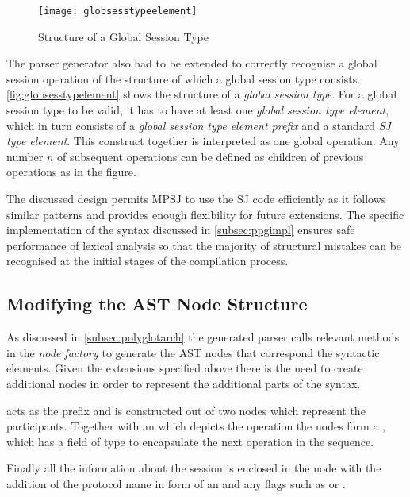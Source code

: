 \begin{figure}[H]
\begin{center}
\texttt{[image: globsesstypeelement]}
\caption{Structure of a Global Session Type}
\label{fig:globsesstypelement}
\end{center}
\end{figure}

The parser generator also had to be extended to correctly recognise a global session operation of the structure  of which a global session type consists. \autoref{fig:globsesstypelement} shows the structure of a \textit{global session type}. For a global session type to be valid, it has to have at least one \textit{global session type element}, which in turn consists of a \textit{global session type element prefix} and a standard \textit{SJ type element}. This construct together is interpreted as one global operation. Any number $n$ of subsequent operations can be defined as children of previous operations as in the figure. 

The discussed design permits MPSJ to use the SJ code efficiently as it follows similar patterns and provides enough flexibility for future extensions. The specific implementation of the syntax discussed in \autoref{subsec:ppgimpl} ensures safe performance of lexical analysis so that the majority of structural mistakes can be recognised at the initial stages of the compilation process.


\subsection{Modifying the AST Node Structure}

As discussed in \autoref{subsec:polyglotarch} the generated parser calls relevant methods in the \textit{node factory} to generate the AST nodes that correspond the syntactic elements. Given the extensions specified above there is the need to create additional nodes in order to represent the additional parts of the syntax.

 acts as the prefix and is constructed out of two  nodes which represent the participants. Together with an  which depicts the operation the nodes form a , which has a field  of type  to encapsulate the next operation in the sequence.

Finally all the information about the session is enclosed in the  node with the addition of the protocol name in form of an  and any flags such as  or . 

